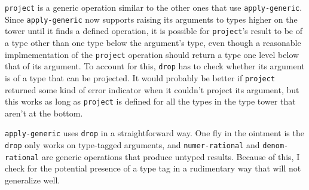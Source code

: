 \documentclass{article}
\begin{document}
\texttt{project} is a generic operation similar to the other ones that use
\texttt{apply-generic}. Since \texttt{apply-generic} now supports raising its
arguments to types higher on the tower until it finds a defined operation, it is
possible for \texttt{project}'s result to be of a type other than one type below
the argument's type, even though a reasonable implmementation of the
\texttt{project} operation should return a type one level below that of its
argument. To account for this, \texttt{drop} has to check whether its argument
is of a type that can be projected. It would probably be better if
\texttt{project} returned some kind of error indicator when it couldn't project
its argument, but this works as long as \texttt{project} is defined for all the
types in the type tower that aren't at the bottom.





\texttt{apply-generic} uses \texttt{drop} in a straightforward way. One fly in
the ointment is the \texttt{drop} only works on type-tagged arguments, and
\texttt{numer-rational} and \texttt{denom-rational} are generic operations that
produce untyped results. Because of this, I check for the potential presence of
a type tag in a rudimentary way that will not generalize well.


\end{document}

